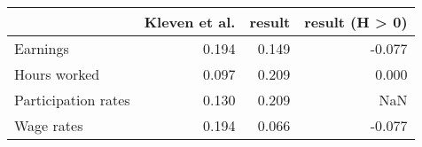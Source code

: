 \begin{tabular}{lrrr}
\toprule
                     &  Kleven et al. &  result &  result (H > 0) \\
\midrule
            Earnings &          0.194 &   0.149 &          -0.077 \\
        Hours worked &          0.097 &   0.209 &           0.000 \\
 Participation rates &          0.130 &   0.209 &             NaN \\
          Wage rates &          0.194 &   0.066 &          -0.077 \\
\bottomrule
\end{tabular}
